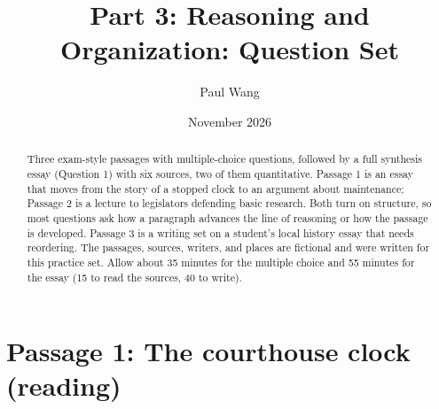 \documentclass[11pt]{article}
\title{Part 3: Reasoning and Organization: Question Set}
\author{Paul Wang}
\date{November 2026}
\begin{document}
\maketitle

\begin{abstract}
Three exam-style passages with multiple-choice questions, followed by a full synthesis essay (Question 1) with six sources, two of them quantitative. Passage 1 is an essay that moves from the story of a stopped clock to an argument about maintenance; Passage 2 is a lecture to legislators defending basic research. Both turn on structure, so most questions ask how a paragraph advances the line of reasoning or how the passage is developed. Passage 3 is a writing set on a student's local history essay that needs reordering. The passages, sources, writers, and places are fictional and were written for this practice set. Allow about 35 minutes for the multiple choice and 55 minutes for the essay (15 to read the sources, 40 to write).
\end{abstract}


\section{Passage 1: The courthouse clock (reading)}
\end{document}
